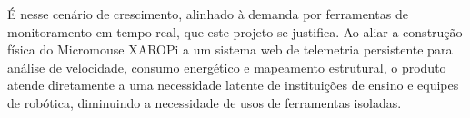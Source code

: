 É nesse cenário de crescimento, alinhado à demanda por ferramentas de monitoramento em tempo real, que este projeto se justifica. Ao aliar a construção física do Micromouse XAROPi a um sistema web de telemetria persistente para análise de velocidade, consumo energético e mapeamento estrutural, o produto atende diretamente a uma necessidade latente de instituições de ensino e equipes de robótica, diminuindo a necessidade de usos de ferramentas isoladas.









